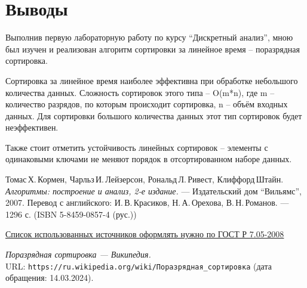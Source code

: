 \documentclass[pdf, unicode, 12pt, a4paper,oneside,fleqn]{article}
\begin{document}
\section{Выводы}

Выполнив первую лабораторную работу по курсу \enquote{Дискретный анализ}, мною был изучен и реализован алгоритм сортировки за линейное время – поразрядная сортировка.

Сортировка за линейное время наиболее эффективна при обработке небольшого количества данных. Сложность сортировок этого типа – O(m*n), где m – количество разрядов, по которым происходит сортировка, n – объём входных данных. Для сортировки большого количества данных этот тип сортировок будет неэффективен.

Также стоит отметить устойчивость линейных сортировок – элементы с одинаковыми ключами не меняют порядок в отсортированном наборе данных.

\pagebreak
\begin{thebibliography}{99}

    Томас\,Х.\,Кормен, Чарльз\,И.\,Лейзерсон, Рональд\,Л.\,Ривест, Клиффорд\,Штайн.
    {\itshape Алгоритмы: построение и анализ, 2-е издание.} --- Издательский дом \enquote{Вильямс}, 2007. Перевод с английского: И.\,В.\,Красиков, Н.\,А.\,Орехова, В.\,Н.\,Романов. --- 1296 с. (ISBN 5-8459-0857-4 (рус.))

    \href{http://www.ifap.ru/library/gost/7052008.pdf}{Список использованных источников оформлять нужно по  ГОСТ Р 7.05-2008}
    
    {\itshape Поразрядная сортировка — Википедия.} \\URL:
    \texttt{https://ru.wikipedia.org/wiki/Поразрядная\_сортировка} (дата обращения: 14.03.2024).
    
    \end{thebibliography}
    \pagebreak
\end{document}
